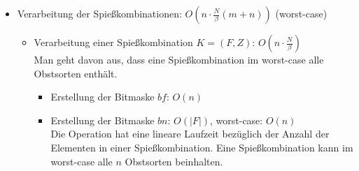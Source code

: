 \begin{itemize}
\begin{itemize}
    \item Umwandlung der Obstsorten in allen Spießkombinationen von Strings zu Integers:
    $O(m \cdot n \log n)$\\
    In jeder Spießkombination können sich im worst-case alle $n$ Obstsorten befinden.
    Das Suchen in einer  hat logarithmische Laufzeit bezüglich der Anzahl
    der Obstsorten: $O(\log n)$.
    Das Einfügen in ein  hat ebenfalls logarithmische Laufzeit bezüglich der Anzahl
    der Obstsorten: $O(\log n)$. 
    Deshalb beträgt die Laufzeit für alle Obstsorten in einer Spießkombination höchstens: $O(n \log n)$. 

    \item Die gesamte Laufzeit für diesen Teil (worst-case): $O(n \cdot \frac{N}{\beta}) + O(n) + O(w \log w)
    + O(n \log n) + O(m \cdot n \log n) + O(w (\log n + \log w)) + O(m \cdot n \log n) = 
    O(n \cdot \frac{N}{\beta} + n + w \log w + n \log n + m \cdot n \log n + w (\log n + \log w) +
    m \cdot n \log n) = 
    O(n \cdot \frac{N}{\beta} + m \cdot n \log n + w (\log n + \log w)) = 
    O(n (\frac{N}{\beta} + m \log n) + w (\log n + \log w))$\\
    Man darf nicht vergessen, dass die Laufzeit optimiert werden könnte, wenn die Eingabe nicht
    aus Wörtern bestünde, sondern aus Zahlen. Man könnte beispielsweise die Wörter früher in Zahlen umwandeln lassen.  
  \end{itemize}


  \item Verarbeitung der Spießkombinationen: $O(n\cdot \frac{N}{\beta}(m + n))$ (worst-case)
  \begin{itemize}
    \item Verarbeitung einer Spießkombination $K = (F, Z)$: $O(n \cdot\frac{N}{\beta})$\\
    Man geht davon aus, dass eine Spießkombination im worst-case alle Obstsorten enthält.
    \begin{itemize}
      \item Erstellung der Bitmaske $bf$: $O(n)$

      \item Erstellung der Bitmaske $bn$: $O(|F|)$, worst-case: $O(n)$\\
      Die Operation hat eine lineare Laufzeit bezüglich der Anzahl der Elementen in 
      einer Spießkombination. Eine Spießkombination kann im worst-case alle $n$
      Obstsorten beinhalten.


\end{itemize}
\end{itemize}
\end{itemize}

